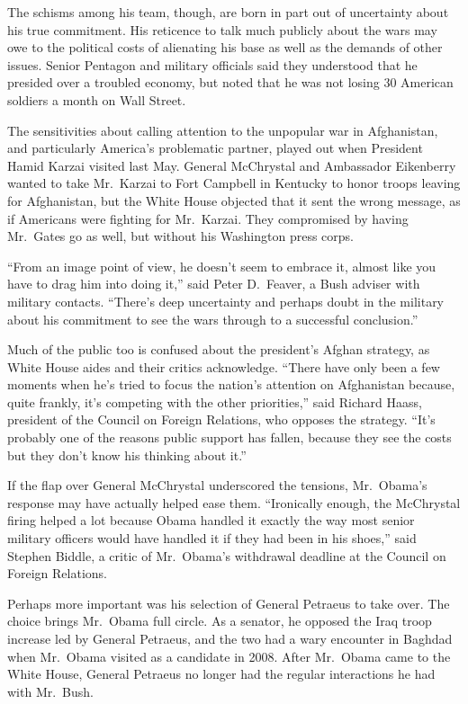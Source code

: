 ﻿\documentclass[12pt]{article}
\begin{document}
The schisms among his team, though, are born in part out of uncertainty about his true commitment.
His reticence to talk much publicly about the wars may owe to the political costs of alienating his
base as well as the demands of other issues. Senior Pentagon and military officials said they
understood that he presided over a troubled economy, but noted that he was not losing 30 American
soldiers a month on Wall Street.

The sensitivities about calling attention to the unpopular war in Afghanistan, and particularly
America's problematic partner, played out when President Hamid Karzai visited last May. General
McChrystal and Ambassador Eikenberry wanted to take Mr.~Karzai to Fort Campbell in Kentucky to honor
troops leaving for Afghanistan, but the White House objected that it sent the wrong message, as if
Americans were fighting for Mr.~Karzai. They compromised by having Mr.~Gates go as well, but without
his Washington press corps.

``From an image point of view, he doesn't seem to embrace it, almost like you have to drag him into
doing it,'' said Peter D.~Feaver, a Bush adviser with military contacts. ``There's deep uncertainty
and perhaps doubt in the military about his commitment to see the wars through to a successful
conclusion.''

Much of the public too is confused about the president's Afghan strategy, as White House aides and
their critics acknowledge. ``There have only been a few moments when he's tried to focus the
nation's attention on Afghanistan because, quite frankly, it's competing with the other
priorities,'' said Richard Haass, president of the Council on Foreign Relations, who opposes the
strategy. ``It's probably one of the reasons public support has fallen, because they see the costs
but they don't know his thinking about it.''

If the flap over General McChrystal underscored the tensions, Mr.~Obama's response may have actually
helped ease them. ``Ironically enough, the McChrystal firing helped a lot because Obama handled it
exactly the way most senior military officers would have handled it if they had been in his shoes,''
said Stephen Biddle, a critic of Mr.~Obama's withdrawal deadline at the Council on Foreign
Relations.

Perhaps more important was his selection of General Petraeus to take over. The choice brings
Mr.~Obama full circle. As a senator, he opposed the Iraq troop increase led by General Petraeus, and
the two had a wary encounter in Baghdad when Mr.~Obama visited as a candidate in 2008. After
Mr.~Obama came to the White House, General Petraeus no longer had the regular interactions he had
with Mr.~Bush.
\end{document}
